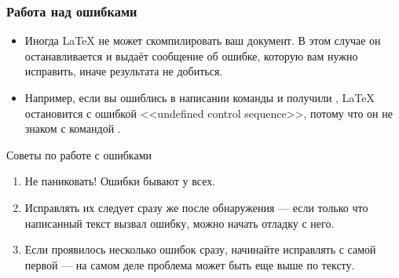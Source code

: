 \documentclass{beamer}
\begin{document}
\begin{frame}[fragile]
\frametitle{Работа над ошибками}
\vspace{-3ex}
\small
\begin{itemize}
\item Иногда \LaTeX{} не может скомпилировать ваш документ. В этом случае он
останавливается и выдаёт сообщение об ошибке, которую вам нужно исправить,
иначе результата не добиться.
\item Например, если вы ошиблись в написании команды  и получили
, \LaTeX{} остановится с ошибкой <<undefined control sequence>>,
потому что он не знаком с командой .
\end{itemize}
\vspace{-1ex}
\begin{tblock}{Советы по работе с ошибками}
\begin{enumerate}
\item Не паниковать! Ошибки бывают у всех.
\item Исправлять их следует сразу же после обнаружения --- если только что написанный
текст вызвал ошибку, можно начать отладку с него.
\item Если проявилось несколько ошибок сразу, начинайте исправлять с самой первой ---
на самом деле проблема может быть еще выше по тексту.
\end{enumerate}
\end{tblock}
\end{frame}
\end{document}
